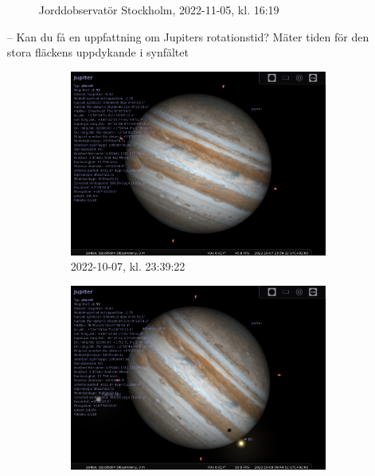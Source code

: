 \documentclass[./exercises.tex]{subfiles}
\begin{document}
\begin{itemize}
\begin{figure}[H]
  \caption{Jorddobservatör Stockholm, 2022-11-05, kl. 16:19 }
  \label{fig4}
\end{figure}
\item[--] Kan du få en uppfattning om Jupiters rotationstid?
Mäter tiden för den stora fläckens uppdykande i synfältet
\begin{figure}[H]
     \centering
     \begin{subfigure}[b]{0.45\textwidth}
         \centering
         \includegraphics[width=\textwidth]{stellarium-044.png}
         \caption{2022-10-07, kl. 23:39:22}
         \label{fig:y equals x}
     \end{subfigure}
     \hfill
     \begin{subfigure}[b]{0.45\textwidth}
         \centering
         \includegraphics[width=\textwidth]{stellarium-045.png}

\end{subfigure}
\end{figure}
\end{itemize}
\end{document}
